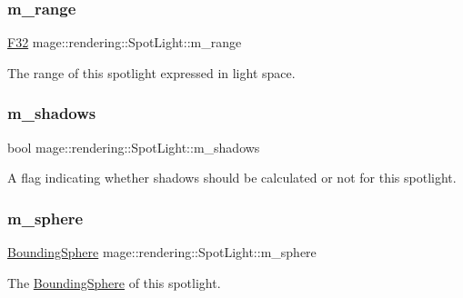 \subsubsection{\texorpdfstring{m\+\_\+range}{m\_range}}
{\footnotesize\ttfamily \hyperlink{namespacemage_aa97e833b45f06d60a0a9c4fc22ae02c0}{F32} mage\+::rendering\+::\+Spot\+Light\+::m\+\_\+range\hspace{0.3cm}{\ttfamily [private]}}

The range of this spotlight expressed in light space. \hypertarget{classmage_1_1rendering_1_1_spot_light_aa2e1e955cf9fb12a9e064cc523cbbe26}{}\label{classmage_1_1rendering_1_1_spot_light_aa2e1e955cf9fb12a9e064cc523cbbe26} 
\subsubsection{\texorpdfstring{m\+\_\+shadows}{m\_shadows}}
{\footnotesize\ttfamily bool mage\+::rendering\+::\+Spot\+Light\+::m\+\_\+shadows\hspace{0.3cm}{\ttfamily [private]}}

A flag indicating whether shadows should be calculated or not for this spotlight. \hypertarget{classmage_1_1rendering_1_1_spot_light_a24667e6bec37a402627c20283795de95}{}\label{classmage_1_1rendering_1_1_spot_light_a24667e6bec37a402627c20283795de95} 
\subsubsection{\texorpdfstring{m\+\_\+sphere}{m\_sphere}}
{\footnotesize\ttfamily \hyperlink{classmage_1_1_bounding_sphere}{Bounding\+Sphere} mage\+::rendering\+::\+Spot\+Light\+::m\+\_\+sphere\hspace{0.3cm}{\ttfamily [private]}}

The \hyperlink{classmage_1_1_bounding_sphere}{Bounding\+Sphere} of this spotlight. 